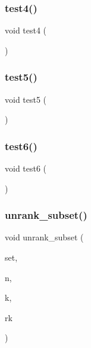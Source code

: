 \mbox{\label{test2_8_c_a327d8cef466a7560ead5eb3995c0cbae}} 
\subsubsection{\texorpdfstring{test4()}{test4()}}
{\footnotesize\ttfamily void test4 (\begin{DoxyParamCaption}{ }\end{DoxyParamCaption})}

\mbox{\label{test2_8_c_a8e1be3038bbc558f32a409f076126c33}} 
\subsubsection{\texorpdfstring{test5()}{test5()}}
{\footnotesize\ttfamily void test5 (\begin{DoxyParamCaption}{ }\end{DoxyParamCaption})}

\mbox{\label{test2_8_c_a9725331980ffa46dc478f6728c4e57ce}} 
\subsubsection{\texorpdfstring{test6()}{test6()}}
{\footnotesize\ttfamily void test6 (\begin{DoxyParamCaption}{ }\end{DoxyParamCaption})}

\mbox{\label{test2_8_c_a6e62c789be7f7dbbd6b92e0bd4d23fb6}} 
\subsubsection{\texorpdfstring{unrank\+\_\+subset()}{unrank\_subset()}}
{\footnotesize\ttfamily void unrank\+\_\+subset (\begin{DoxyParamCaption}\item[{\mbox{\hyperlink{galois_8h_a09fddde158a3a20bd2dcadb609de11dc}{I\+NT}} $\ast$}]{set,  }\item[{\mbox{\hyperlink{galois_8h_a09fddde158a3a20bd2dcadb609de11dc}{I\+NT}}}]{n,  }\item[{\mbox{\hyperlink{galois_8h_a09fddde158a3a20bd2dcadb609de11dc}{I\+NT}} \&}]{k,  }\item[{\mbox{\hyperlink{classlonginteger__object}{longinteger\+\_\+object}} \&}]{rk }\end{DoxyParamCaption})}



